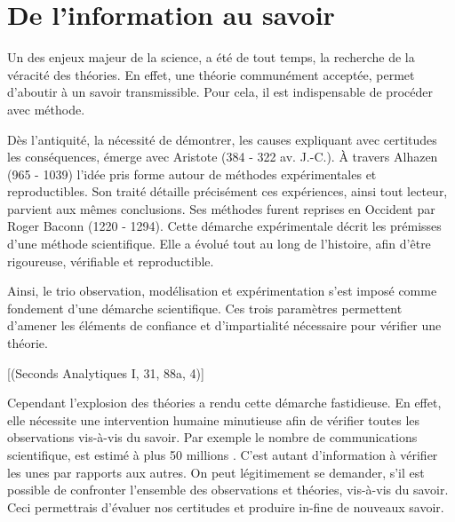 \chapter*{De l'information au savoir}

Un des enjeux majeur de la science, a été de tout temps, la recherche de la véracité des théories. En effet, une théorie communément acceptée, permet d'aboutir à un savoir transmissible. Pour cela, il est indispensable de procéder avec méthode.

Dès l'antiquité, la nécessité de démontrer, les causes expliquant avec certitudes les conséquences, émerge avec Aristote (384 - 322 av. J.-C.). À travers Alhazen (965 - 1039) l'idée pris forme autour de méthodes expérimentales et reproductibles. Son traité  détaille précisément ces expériences, ainsi tout lecteur, parvient aux mêmes conclusions. Ses méthodes furent reprises en Occident par Roger Baconn (1220 - 1294). Cette démarche expérimentale décrit les prémisses d'une méthode scientifique. Elle a évolué tout au long de l'histoire, afin d'être rigoureuse, vérifiable et reproductible.

Ainsi, le trio observation, modélisation et expérimentation s'est imposé comme fondement d'une démarche scientifique. Ces trois paramètres permettent d'amener les éléments de confiance et d'impartialité nécessaire pour vérifier une théorie.

[(Seconds Analytiques I, 31, 88a, 4)]


Cependant l'explosion des théories a rendu cette démarche fastidieuse. En effet, elle nécessite une intervention humaine minutieuse afin de vérifier toutes les observations vis-à-vis du savoir. Par exemple le nombre de communications scientifique, est estimé à plus 50 millions \citep[voir][]{LEAP:LEAP0509}. C'est autant d'information à vérifier les unes par rapports aux autres. On peut légitimement se demander, s'il est possible de confronter l'ensemble des observations et théories, vis-à-vis du savoir. Ceci permettrais d'évaluer nos certitudes et produire in-fine de nouveaux savoir.

